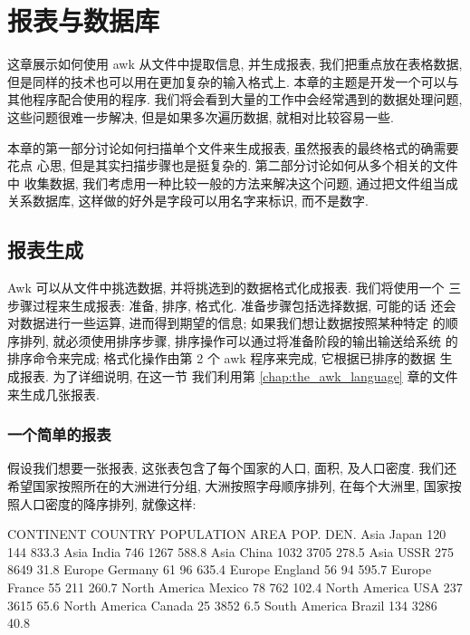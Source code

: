 \chapter{报表与数据库}
\label{chap:reports_and_databases}

这章展示如何使用 awk 从文件中提取信息, 并生成报表, 我们把重点放在表格数据,
但是同样的技术也可以用在更加复杂的输入格式上. 本章的主题是开发一个可以与
其他程序配合使用的程序. 我们将会看到大量的工作中会经常遇到的数据处理问题,
这些问题很难一步解决, 但是如果多次遍历数据, 就相对比较容易一些.

本章的第一部分讨论如何扫描单个文件来生成报表, 虽然报表的最终格式的确需要花点
心思, 但是其实扫描步骤也是挺复杂的. 第二部分讨论如何从多个相关的文件中
收集数据, 我们考虑用一种比较一般的方法来解决这个问题, 通过把文件组当成
关系数据库, 这样做的好外是字段可以用名字来标识, 而不是数字.

\section{报表生成}
\label{sec:generating_reports}

Awk 可以从文件中挑选数据, 并将挑选到的数据格式化成报表. 我们将使用一个
三步骤过程来生成报表: 准备, 排序, 格式化. 准备步骤包括选择数据, 可能的话
还会对数据进行一些运算, 进而得到期望的信息; 如果我们想让数据按照某种特定
的顺序排列, 就必须使用排序步骤, 排序操作可以通过将准备阶段的输出输送给系统
的排序命令来完成; 格式化操作由第 2 个 awk 程序来完成, 它根据已排序的数据
生成报表. 为了详细说明, 在这一节 我们利用第 \ref{chap:the_awk_language} 
章的文件 来生成几张报表.

\subsection{一个简单的报表}
\label{subsec:a_simple_report}

假设我们想要一张报表, 这张表包含了每个国家的人口, 面积, 及人口密度. 
我们还希望国家按照所在的大洲进行分组, 大洲按照字母顺序排列, 在每个大洲里,
国家按照人口密度的降序排列, 就像这样:
\begin{shell}
    CONTINENT       COUNTRY    POPULATION    AREA    POP. DEN.
    Asia            Japan          120        144      833.3
    Asia            India          746       1267      588.8
    Asia            China         1032       3705      278.5
    Asia            USSR           275       8649       31.8
    Europe          Germany         61         96      635.4
    Europe          England         56         94      595.7
    Europe          France          55        211      260.7
    North America   Mexico          78        762      102.4
    North America   USA            237       3615       65.6
    North America   Canada          25       3852        6.5
    South America   Brazil         134       3286       40.8
\end{shell}


